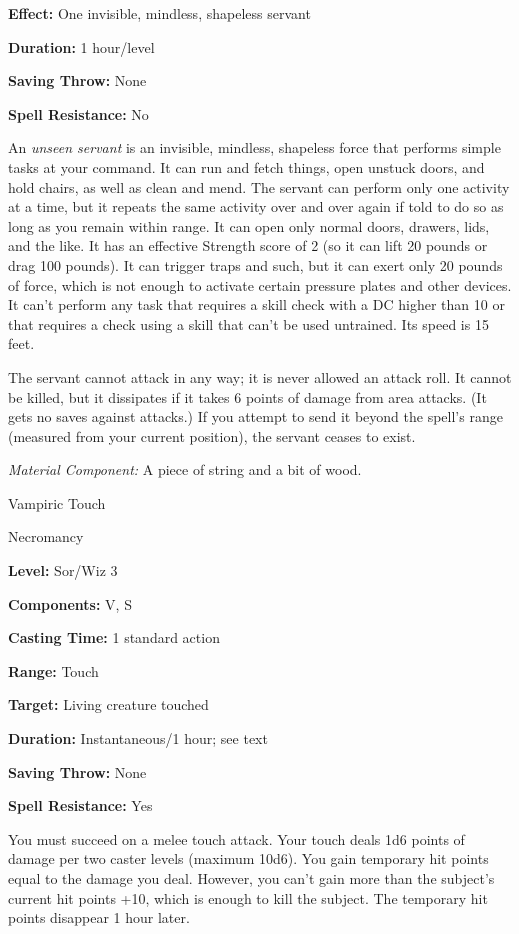 \documentclass{article}
\begin{document}
\textbf{Effect:} One invisible, mindless, shapeless servant

\textbf{Duration:} 1 hour/level

\textbf{Saving Throw:} None

\textbf{Spell Resistance:} No

An \textit{unseen servant }is an invisible, mindless, shapeless force that performs 
simple tasks at your command. It can run and fetch things, open unstuck doors, 
and hold chairs, as well as clean and mend. The servant can perform only one activity 
at a time, but it repeats the same activity over and over again if told to do so 
as long as you remain within range. It can open only normal doors, drawers, lids, 
and the like. It has an effective Strength score of 2 (so it can lift 20 pounds 
or drag 100 pounds). It can trigger traps and such, but it can exert only 20 pounds 
of force, which is not enough to activate certain pressure plates and other devices. 
It can't perform any task that requires a skill check with a DC higher than 10 
or that requires a check using a skill that can't be used untrained. Its speed 
is 15 feet.

The servant cannot attack in any way; it is never allowed an attack roll. It cannot 
be killed, but it dissipates if it takes 6 points of damage from area attacks. 
(It gets no saves against attacks.) If you attempt to send it beyond the spell's 
range (measured from your current position), the servant ceases to exist.

\textit{Material Component: }A piece of string and a bit of wood.

\vspace{12pt}
Vampiric Touch

Necromancy

\textbf{Level:} Sor/Wiz 3

\textbf{Components:} V, S

\textbf{Casting Time:} 1 standard action

\textbf{Range:} Touch

\textbf{Target:} Living creature touched

\textbf{Duration:} Instantaneous/1 hour; see text

\textbf{Saving Throw:} None

\textbf{Spell Resistance:} Yes

You must succeed on a melee touch attack. Your touch deals 1d6 points of damage 
per two caster levels (maximum 10d6). You gain temporary hit points equal to the 
damage you deal. However, you can't gain more than the subject's current hit points 
+10, which is enough to kill the subject. The temporary hit points disappear 1 
hour later.
\end{document}
